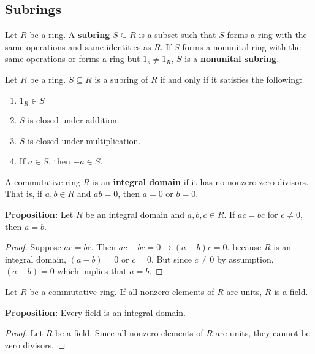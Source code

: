 \documentclass [12pt] {article}
\newenvironment{definition}[1]{\begin{tcolorbox}[title={Definition: #1},colback=blue!5!white,colframe=black!75!blue]}{\end{tcolorbox}}
\renewcommand{\bf}[1]{\textbf{{#1}}}
\begin{document}
\subsection{Subrings}
\begin{definition}{Subring}
    Let $R$ be a ring. A \bf{subring} $S \subseteq R$ is a subset such that $S$ forms a ring with
    the same operations and same identities as $R$. If $S$ forms a nonunital ring with the same
    operations or forms a ring but $1_s \neq 1_R$, $S$ is a \bf{nonunital subring}. \vspace{0.5em}

    Let $R$ be a ring. $S \subseteq R$ is a subring of $R$ if and only if it satisfies the following:
    \begin{enumerate}[label=(\arabic*)]
        \item $1_R \in S$
        \item $S$ is closed under addition.
        \item $S$ is closed under multiplication.
        \item If $a \in S$, then $-a \in S$.
    \end{enumerate}
\end{definition}

\begin{definition}{Integral Domain}
    A commutative ring $R$ is an \bf{integral domain} if it has no nonzero zero divisors. That is, 
    if $a, b \in R$ and $ab = 0$, then $a = 0$ or $b = 0$.
\end{definition}
\bf{Proposition:} Let $R$ be an integral domain and $a, b, c \in R$. If $ac = bc$ for $c \neq 0$,
then $a = b$.
\begin{proof}
    Suppose $ac = bc$. Then $ac - bc = 0 \to (a - b) c = 0$. because $R$ is an integral domain,
    $(a - b) = 0$ or $c = 0$. But since $c \neq 0$ by assumption, $(a - b) = 0$ which implies that
    $a = b$.
\end{proof}

\begin{definition}{Field}
    Let $R$ be a commutative ring. If all nonzero elements of $R$ are units, $R$ is a field.
\end{definition}
\newpage
\bf{Proposition:} Every field is an integral domain.
\begin{proof}
    Let $R$ be a field. Since all nonzero elements of $R$ are units, they cannot be zero divisors.
\end{proof}
\end{document}
